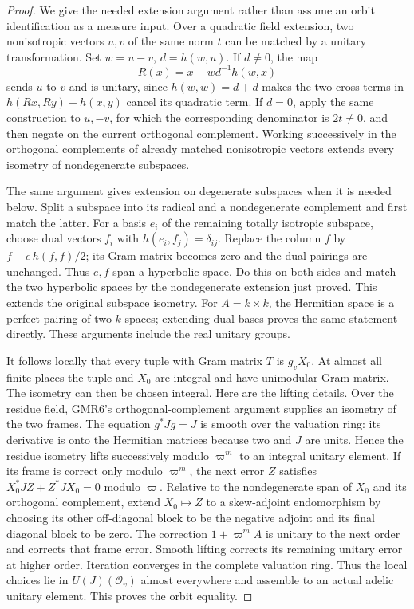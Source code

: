 \documentclass[11pt,a4paper]{article}
\numberwithin{equation}{section}
\theoremstyle{remark}\newtheorem{remark}[theorem]{Remark}
\begin{document}
\begin{proof}
We give the needed extension argument rather than assume an orbit
identification as a measure input.  Over a quadratic field extension,
two nonisotropic vectors $u,v$ of the same norm $t$ can be matched by
a unitary transformation.  Set $w=u-v$, $d=h(w,u)$.  If $d\ne0$, the
map
\[
 R(x)=x-wd^{-1}h(w,x)
 \tag{GMR.18}
\]
sends $u$ to $v$ and is unitary, since
$h(w,w)=d+\bar d$ makes the two cross terms in
$h(Rx,Ry)-h(x,y)$ cancel its quadratic term.
If $d=0$, apply the same construction to $u,-v$, for which the
corresponding denominator is $2t\ne0$, and then negate on the current
orthogonal complement.  Working successively in the orthogonal
complements of already matched nonisotropic vectors extends every
isometry of nondegenerate subspaces.

The same argument gives extension on degenerate subspaces when it is
needed below.  Split a subspace into its radical and a nondegenerate
complement and first match the latter.  For a basis $e_i$ of the
remaining totally isotropic subspace, choose dual vectors $f_i$ with
$h(e_i,f_j)=\delta_{ij}$.  Replace the column $f$ by
$f-e\,h(f,f)/2$; its Gram matrix becomes zero and the dual pairings
are unchanged.  Thus $e,f$ span a hyperbolic space.  Do this on both
sides and match the two hyperbolic spaces by the nondegenerate
extension just proved.  This extends the original subspace isometry.
For $A=k\times k$, the Hermitian space is a perfect pairing of two
$k$-spaces; extending dual bases proves the same statement directly.
These arguments include the real unitary groups.

It follows locally that every tuple with Gram matrix $T$ is $g_vX_0$.
At almost all finite places the tuple and $X_0$ are integral and have
unimodular Gram matrix.  The isometry can then be chosen integral.
Here are the lifting details.  Over the residue field, GMR6's
orthogonal-complement argument supplies an isometry of the two frames.
The equation $g^*Jg=J$ is smooth over the valuation ring: its derivative
is onto the Hermitian matrices because two and $J$ are units.  Hence
the residue isometry lifts successively modulo $\varpi^m$ to an
integral unitary element.  If its frame is correct only modulo
$\varpi^m$, the next error $Z$ satisfies
$X_0^*JZ+Z^*JX_0=0$ modulo $\varpi$.  Relative to the nondegenerate
span of $X_0$ and its orthogonal complement, extend
$X_0\mapsto Z$ to a skew-adjoint endomorphism by choosing its other
off-diagonal block to be the negative adjoint and its final diagonal
block to be zero.  The correction $1+\varpi^m A$ is unitary to the
next order and corrects that frame error.  Smooth lifting corrects its
remaining unitary error at higher order.  Iteration converges in the
complete valuation ring.  Thus the local choices lie in
$U(J)(\mathcal O_v)$ almost everywhere and assemble to an actual
adelic unitary element.  This proves the orbit equality.


\end{proof}
\end{document}
